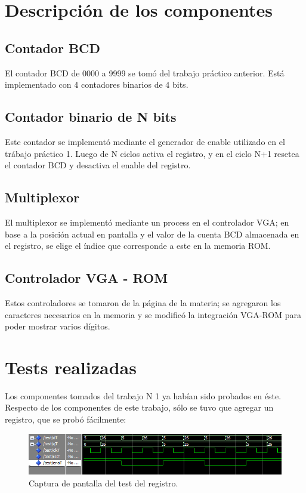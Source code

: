 \documentclass[a4paper,10pt]{article}
\begin{document}
\section{Descripción de los componentes}
\subsection{Contador BCD}
El contador BCD de 0000 a 9999 se tomó del trabajo práctico anterior. Está implementado con 4 contadores binarios de 4 bits.

\subsection{Contador binario de N bits}\label{gen}
Este contador se implementó mediante el generador de enable utilizado en el trábajo práctico 1. Luego de N ciclos activa el registro, y en
el ciclo N+1 resetea el contador BCD y desactiva el enable del registro.

\subsection{Multiplexor}
El multiplexor se implementó mediante un process en el controlador VGA; en base a la posición actual en pantalla y el valor de la cuenta BCD almacenada en el registro, se elige el índice que corresponde a este en la memoria ROM.

\subsection{Controlador VGA - ROM}
Estos controladores se tomaron de la página de la materia; se agregaron los caracteres necesarios en la memoria y se modificó la integración VGA-ROM para poder mostrar varios dígitos.

\section{Tests realizadas}
Los componentes tomados del trabajo N 1 ya habían sido probados en éste. Respecto de los componentes de este trabajo, sólo se tuvo que agregar un registro, que se probó fácilmente:
	\begin{figure}[h]
		\centering
		\includegraphics[width=17cm]{img/testReg.png}
		\caption{Captura de pantalla del test del registro.}
	\end{figure}
	
\end{document}
